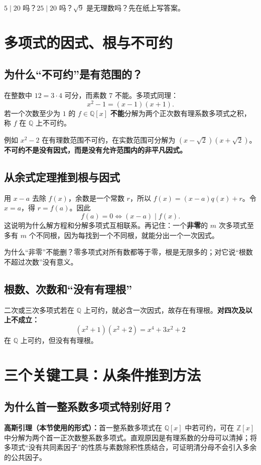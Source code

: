\documentclass[12pt,a4paper,UTF8,fontset=none]{ctexart}
\begin{document}
\begin{trybox}
$5\mid20$ 吗？$25\mid20$ 吗？$\sqrt9$ 是无理数吗？先在纸上写答案。
\end{trybox}

\section{多项式的因式、根与不可约}
\subsection{为什么“不可约”是有范围的？}
在整数中 $12=3\cdot4$ 可分，而素数 $7$ 不能。多项式同理：
\[
x^2-1=(x-1)(x+1).
\]
若一个次数至少为 $1$ 的 $f\in\mathbb Q[x]$ \textbf{不能}分解为两个正次数有理系数多项式之积，称 $f$ 在 $\mathbb Q$ 上不可约。

例如 $x^2-2$ 在有理数范围不可约，在实数范围可分解为 $(x-\sqrt2)(x+\sqrt2)$。\textbf{不可约不是没有因式，而是没有允许范围内的非平凡因式。}

\subsection{从余式定理推到根与因式}
用 $x-a$ 去除 $f(x)$，余数是一个常数 $r$，所以 $f(x)=(x-a)q(x)+r$。令 $x=a$，得 $r=f(a)$。因此
\[
\boxed{f(a)=0\iff (x-a)\mid f(x)}.
\]
这说明为什么解方程和分解多项式互相联系。再记住：一个\textbf{非零}的 $m$ 次多项式至多有 $m$ 个不同根，因为每找到一个不同根，就能分出一个一次因式。

\begin{whybox}
为什么“非零”不能删？零多项式对所有数都等于零，根是无限多的；对它说“根数不超过次数”没有意义。
\end{whybox}

\subsection{根数、次数和“没有有理根”}
二次或三次多项式若在 $\mathbb Q$ 上可约，就必含一次因式，故存在有理根。\textbf{对四次及以上不成立：}
\[
(x^2+1)(x^2+2)=x^4+3x^2+2
\]
在 $\mathbb Q$ 上可约，但没有有理根。

\section{三个关键工具：从条件推到方法}
\subsection{为什么首一整系数多项式特别好用？}
\textbf{高斯引理（本节使用的形式）：}首一整系数多项式在 $\mathbb Q[x]$ 中若可约，可在 $\mathbb Z[x]$ 中分解为两个首一正次数整系数多项式。直观原因是有理系数的分母可以清掉；将多项式“没有共同素因子”的性质与素数除积性质结合，可证明清分母不会引入多余的公共因子。
\end{document}
